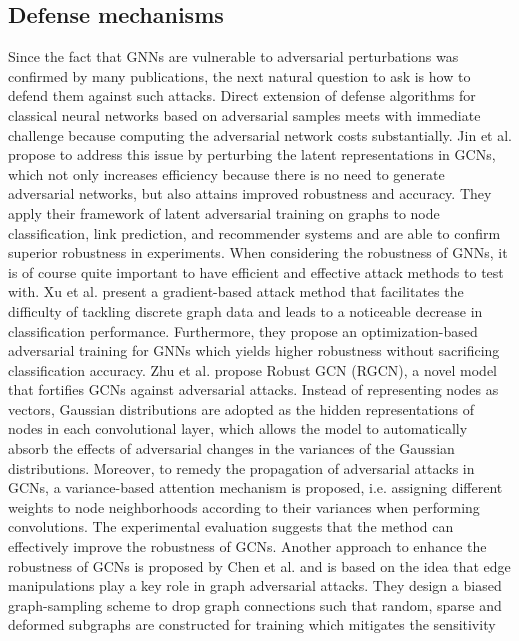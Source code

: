 \documentclass[a4paper,preprint]{sig-alternate}
\begin{document}
\subsection{Defense mechanisms}
\label{sec:rev2}

Since the fact that GNNs are vulnerable to adversarial perturbations was confirmed by many publications, the next natural question to ask
is how to defend them against such attacks. 
Direct extension of defense algorithms for classical neural networks based on adversarial samples meets with immediate challenge because
computing the adversarial network costs substantially. \cite{Jin_2020} Jin et al. propose to address this issue by perturbing the latent 
representations in GCNs, which not only increases efficiency because there is no need to generate adversarial networks, but also attains 
improved robustness and accuracy. They apply their framework of latent adversarial training on graphs to node classification,
link prediction, and recommender systems and are able to confirm superior robustness in experiments.
When considering the robustness of GNNs, it is of course quite important to have efficient and effective attack methods to test with.
Xu et al. \cite{xu2019topology} present a gradient-based attack method that facilitates the difficulty of tackling discrete graph data
and leads to a noticeable decrease in classification performance. Furthermore, they propose an optimization-based adversarial training
for GNNs which yields higher robustness without sacrificing classification accuracy.
Zhu et al. \cite{10.1145/3292500.3330851} propose Robust GCN (RGCN), a novel model that fortifies GCNs against adversarial attacks.
Instead of representing  nodes as vectors, Gaussian distributions are adopted as the hidden representations of nodes in each
convolutional layer, which allows the model to automatically absorb the effects of adversarial changes in the variances of the Gaussian distributions.
Moreover, to remedy the propagation of adversarial attacks in GCNs, a variance-based attention mechanism is proposed, i.e. assigning different
weights to node neighborhoods according to their variances when performing convolutions. The experimental evaluation suggests that
the method can effectively improve the robustness of GCNs.
Another approach to enhance the robustness of GCNs is proposed by Chen et al. \cite{Chen_2020} and is based on the idea that
edge manipulations play a key role in graph adversarial attacks. They design a biased graph-sampling scheme to drop graph connections
such that random, sparse and deformed subgraphs are constructed for training which mitigates the sensitivity 
\end{document}
